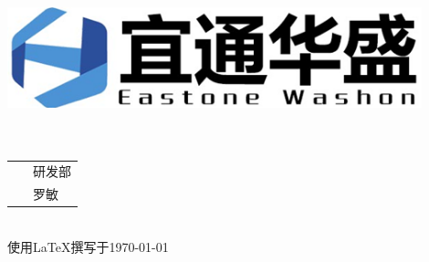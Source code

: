 \documentclass[a4paper,12pt]{report}
\begin{document}
\begin{titlepage}
	\begin{center}
		
    \includegraphics[width=0.9\textwidth]{figure//etws.png}\\
    \vspace{40mm}
    \textbf{}\\[0.8cm]
    \textbf{}\\[3cm]
    
	\vspace{\fill}
	
\setlength{\extrarowheight}{3mm}
{\songti{}	
\begin{tabular}{rl}
	
	{\makebox[4\ccwd][s]{部\qquad 门：}}& ~\kaishu 研发部\\
	
	{\makebox[4\ccwd][s]{编\qquad 制：}}& ~\kaishu 罗敏 \\ 

\end{tabular}
 }\\[2cm]
\vspace{\fill}
使用\LaTeX 撰写于\today
	\end{center}	
\end{titlepage}

\begin{abstract}
\begin{spacing}{1.5}
	{
	本文主要是关于雷达系统远程控制网络的管理方案设计，目的是实现全国各地雷达系统的远程监
	测与控制，主要是从两个方面来考虑如何设计实现，第一是从可操作性方面来考虑,因整个控制
	网连接的设备较多，特别是雷达设备甚至可能是位于郊区等人迹罕至的地方，将所有的接入设备
	都连接固定IP专网接口是不太现实的，而且费用过高，方案必须符合实际具有可操作性。第二个
	是从安全性的角度，整个系统分布与全国各地，且连接的雷达用户各不相同，需要考虑用户之间
	的隔离，以及防止非法的网络入侵破坏雷达系统工作。要实现这两个目的，可行的方案是采用
	VPN技术,将分布于各地的雷达设备、控制主机和后端管理服务器配置成为一个虚拟专网，这样
	的设计只需要位于后端的VPN服务器一个固定IP，其它设备只需要连接普通的互联网服务便可以
	实现目的，费用低廉具有可操作性,且VPN的数据传输采用了多重加密技术可以有效防止数据泄
	露。

	\textbf{关键字}：\quad 远程监控 \quad VPN \quad 虚拟专网 \quad 安全性
	}
\end{spacing}
\end{abstract}
\end{document}
